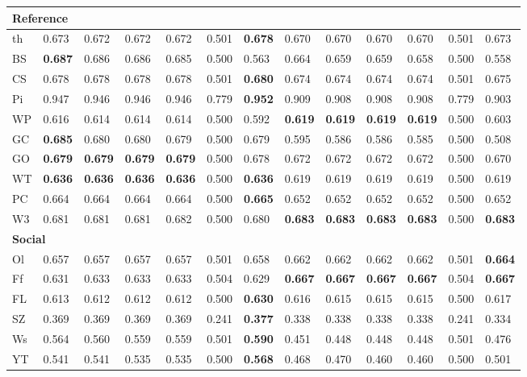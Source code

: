 \begin{longtable}{ lllllllllllll }
\hline
\multicolumn{13}{|l|}{\textbf{Reference}} \\
\hline
\textsf{th}                   & 0.673 & 0.672 & 0.672 & 0.672 & 0.501 & \bf{0.678} & 0.670 & 0.670 & 0.670 & 0.670 & 0.501 & 0.673 \\
\textsf{BS}                   & \bf{0.687} & 0.686 & 0.686 & 0.685 & 0.500 & 0.563 & 0.664 & 0.659 & 0.659 & 0.658 & 0.500 & 0.558 \\
\textsf{CS}                   & 0.678 & 0.678 & 0.678 & 0.678 & 0.501 & \bf{0.680} & 0.674 & 0.674 & 0.674 & 0.674 & 0.501 & 0.675 \\
\textsf{Pi}                   & 0.947 & 0.946 & 0.946 & 0.946 & 0.779 & \bf{0.952} & 0.909 & 0.908 & 0.908 & 0.908 & 0.779 & 0.903 \\
\textsf{WP}                   & 0.616 & 0.614 & 0.614 & 0.614 & 0.500 & 0.592 & \bf{0.619} & \bf{0.619} & \bf{0.619} & \bf{0.619} & 0.500 & 0.603 \\
\textsf{GC}                   & \bf{0.685} & 0.680 & 0.680 & 0.679 & 0.500 & 0.679 & 0.595 & 0.586 & 0.586 & 0.585 & 0.500 & 0.508 \\
\textsf{GO}                   & \bf{0.679} & \bf{0.679} & \bf{0.679} & \bf{0.679} & 0.500 & 0.678 & 0.672 & 0.672 & 0.672 & 0.672 & 0.500 & 0.670 \\
\textsf{WT}                   & \bf{0.636} & \bf{0.636} & \bf{0.636} & \bf{0.636} & 0.500 & \bf{0.636} & 0.619 & 0.619 & 0.619 & 0.619 & 0.500 & 0.619 \\
\textsf{PC}                   & 0.664 & 0.664 & 0.664 & 0.664 & 0.500 & \bf{0.665} & 0.652 & 0.652 & 0.652 & 0.652 & 0.500 & 0.652 \\
\textsf{W3}                   & 0.681 & 0.681 & 0.681 & 0.682 & 0.500 & 0.680 & \bf{0.683} & \bf{0.683} & \bf{0.683} & \bf{0.683} & 0.500 & \bf{0.683} \\

\hline
\multicolumn{13}{|l|}{\textbf{Social}} \\
\hline
\textsf{Ol}                   & 0.657 & 0.657 & 0.657 & 0.657 & 0.501 & 0.658 & 0.662 & 0.662 & 0.662 & 0.662 & 0.501 & \bf{0.664} \\
\textsf{Ff}                   & 0.631 & 0.633 & 0.633 & 0.633 & 0.504 & 0.629 & \bf{0.667} & \bf{0.667} & \bf{0.667} & \bf{0.667} & 0.504 & \bf{0.667} \\
\textsf{FL}                   & 0.613 & 0.612 & 0.612 & 0.612 & 0.500 & \bf{0.630} & 0.616 & 0.615 & 0.615 & 0.615 & 0.500 & 0.617 \\
\textsf{SZ}                   & 0.369 & 0.369 & 0.369 & 0.369 & 0.241 & \bf{0.377} & 0.338 & 0.338 & 0.338 & 0.338 & 0.241 & 0.334 \\
\textsf{Ws}                   & 0.564 & 0.560 & 0.559 & 0.559 & 0.501 & \bf{0.590} & 0.451 & 0.448 & 0.448 & 0.448 & 0.501 & 0.476 \\
\textsf{YT}                   & 0.541 & 0.541 & 0.535 & 0.535 & 0.500 & \bf{0.568} & 0.468 & 0.470 & 0.460 & 0.460 & 0.500 & 0.501 \\


\end{longtable}
